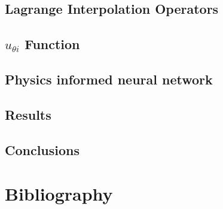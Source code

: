 \documentclass{beamer}
\begin{document}
\subsection{Lagrange Interpolation Operators}

\subsection{$u_{\theta i}$ Function}


\subsection{Physics informed neural network}





\subsection{Results}










\subsection{Conclusions}



\section{Bibliography}

\end{document}
